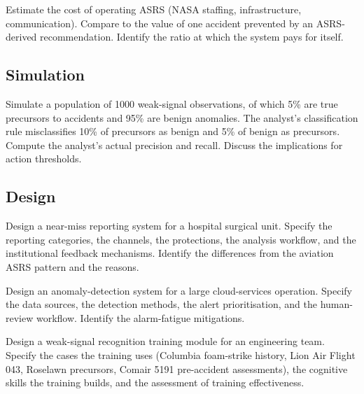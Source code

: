 \begin{exercise}
Estimate the cost of operating ASRS (NASA staffing, infrastructure, communication). Compare to the value of one accident prevented by an ASRS-derived recommendation. Identify the ratio at which the system pays for itself.
\end{exercise}

\subsection*{Simulation}

\begin{exercise}
Simulate a population of 1000 weak-signal observations, of which 5\% are true precursors to accidents and 95\% are benign anomalies. The analyst's classification rule misclassifies 10\% of precursors as benign and 5\% of benign as precursors. Compute the analyst's actual precision and recall. Discuss the implications for action thresholds.
\end{exercise}

\subsection*{Design}

\begin{exercise}
Design a near-miss reporting system for a hospital surgical unit. Specify the reporting categories, the channels, the protections, the analysis workflow, and the institutional feedback mechanisms. Identify the differences from the aviation ASRS pattern and the reasons.
\end{exercise}

\begin{exercise}
Design an anomaly-detection system for a large cloud-services operation. Specify the data sources, the detection methods, the alert prioritisation, and the human-review workflow. Identify the alarm-fatigue mitigations.
\end{exercise}

\begin{exercise}
Design a weak-signal recognition training module for an engineering team. Specify the cases the training uses (Columbia foam-strike history, Lion Air Flight 043, Roselawn precursors, Comair 5191 pre-accident assessments), the cognitive skills the training builds, and the assessment of training effectiveness.
\end{exercise}

